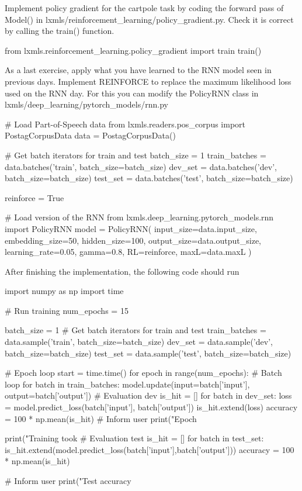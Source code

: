 \begin{exercise}
Implement policy gradient for the cartpole task by coding the forward pass of Model() in lxmls/reinforcement\_learning/policy\_gradient.py. Check it is correct by calling the train() function.
\begin{python}
from lxmls.reinforcement_learning.policy_gradient import train
train()
\end{python}
\end{exercise}


\begin{exercise}
As a last exercise, apply what you have learned to the RNN model seen in previous days. Implement REINFORCE to replace the maximum likelihood loss used on the RNN day. For this you can modify the PolicyRNN class in lxmls/deep\_learning/pytorch\_models/rnn.py 
\begin{python}
# Load Part-of-Speech data 
from lxmls.readers.pos_corpus import PostagCorpusData
data = PostagCorpusData()

# Get batch iterators for train and test
batch_size = 1
train_batches = data.batches('train', batch_size=batch_size)
dev_set = data.batches('dev', batch_size=batch_size)
test_set = data.batches('test', batch_size=batch_size)
\end{python}
\begin{python}
reinforce = True

# Load version of the RNN 
from lxmls.deep_learning.pytorch_models.rnn import PolicyRNN
model = PolicyRNN(
    input_size=data.input_size,
    embedding_size=50,
    hidden_size=100,
    output_size=data.output_size,
    learning_rate=0.05,
    gamma=0.8,
    RL=reinforce,
    maxL=data.maxL
)
\end{python}

After finishing the implementation, the following code should run
\begin{python}
import numpy as np
import time

# Run training
num_epochs = 15

batch_size = 1
# Get batch iterators for train and test
train_batches = data.sample('train', batch_size=batch_size)
dev_set = data.sample('dev', batch_size=batch_size)
test_set = data.sample('test', batch_size=batch_size)

# Epoch loop
start = time.time()
for epoch in range(num_epochs):
    # Batch loop
    for batch in train_batches:
        model.update(input=batch['input'], output=batch['output'])
    # Evaluation dev
    is_hit = []
    for batch in dev_set:
        loss = model.predict_loss(batch['input'], batch['output'])
        is_hit.extend(loss)
    accuracy = 100 * np.mean(is_hit)
    # Inform user
    print("Epoch %

print("Training took %
# Evaluation test
is_hit = []
for batch in test_set:
    is_hit.extend(model.predict_loss(batch['input'],batch['output']))
accuracy = 100 * np.mean(is_hit)

# Inform user
print("Test accuracy %
\end{python}
\end{exercise}
